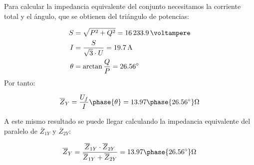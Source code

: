 \begin{enumerate}
  Para calcular la impedancia equivalente del conjunto necesitamos la corriente total y el ángulo, que se obtienen del triángulo de potencias:

  \begin{align*}
    S &= \sqrt{P^2 + Q^2} = \qty{16233.9}{\voltampere}\\
    I &= \frac{S}{\sqrt{3} \cdot U} = \qty{19.7}{\ampere}\\
    \theta &= \arctan{\frac{Q}{P}} = \ang{26.56}
  \end{align*}
  Por tanto:

  \[
    \overline{Z}_{Y} = \frac{U_f}{I}\phase{\theta} = 13.97\phase{\ang{26.56}}\unit{\ohm}
  \]

  A este mismo resultado se puede llegar calculando la impedancia equivalente del paralelo de $\overline{Z}_{1Y}$ y $\overline{Z}_{2Y}$:

  \[
    \overline{Z}_Y = \frac{\overline{Z}_{1Y} \cdot \overline{Z}_{2Y}}{\overline{Z}_{1Y} + \overline{Z}_{2Y}} = 13.97\phase{\ang{26.56}}\unit{\ohm}
  \]
\end{enumerate}


